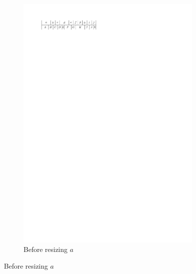   \begin{figure}[b]
    \centering
    \begin{subfigure}[b]{0.45 \textwidth}
      \centering
      \includegraphics{introduction/img/10sidedBefore.pdf}
      \caption{Before resizing $a$}
      \label{fig:intro:10sidedBefore}
    \end{subfigure}


\end{figure}
